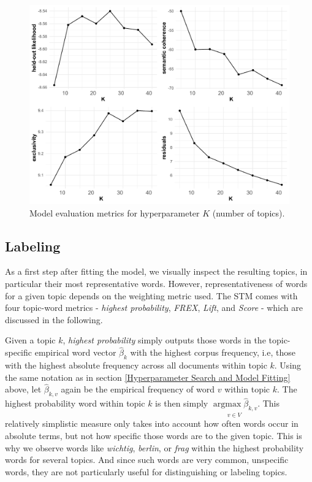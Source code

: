 \begin{figure}[h!]
  \centering
  \captionsetup{justification=centering,margin=2cm}
  \includegraphics[scale = 0.5]{../plots/4_1/searchK.pdf}
  \caption{Model evaluation metrics for hyperparameter $K$ (number of topics).}
  \label{fig:searchK}
\end{figure}

\subsection{Labeling}
\label{Labeling}

As a first step after fitting the model, we visually inspect the resulting topics, in particular their most representative words. However, representativeness of words for a given topic depends on the weighting metric used. The STM comes with four topic-word metrics - \textit{highest probability}, \textit{FREX}, \textit{Lift}, and \textit{Score} - which are discussed in the following.

Given a topic $k$, \textit{highest probability} simply outputs those words in the topic-specific empirical word vector $\hat{\beta}_{k}$ with the highest corpus frequency, i.e, those with the highest absolute frequency across all documents within topic $k$. Using the same notation as in section \ref{Hyperparameter Search and Model Fitting} above, let $\hat{\beta}_{k,v}$ again be the empirical frequency of word $v$ within topic $k$. The highest probability word within topic $k$ is then simply $\underset{v \in V}{\operatorname{argmax}\hat{\beta}_{k,v}}$. This relatively simplistic measure only takes into account how often words occur in absolute terms, but not how specific those words are to the given topic. This is why we observe words like \textit{wichtig}, \textit{berlin}, or \textit{frag} within the highest probability words for several topics. And since such words are very common, unspecific words, they are not particularly useful for distinguishing or labeling topics.

